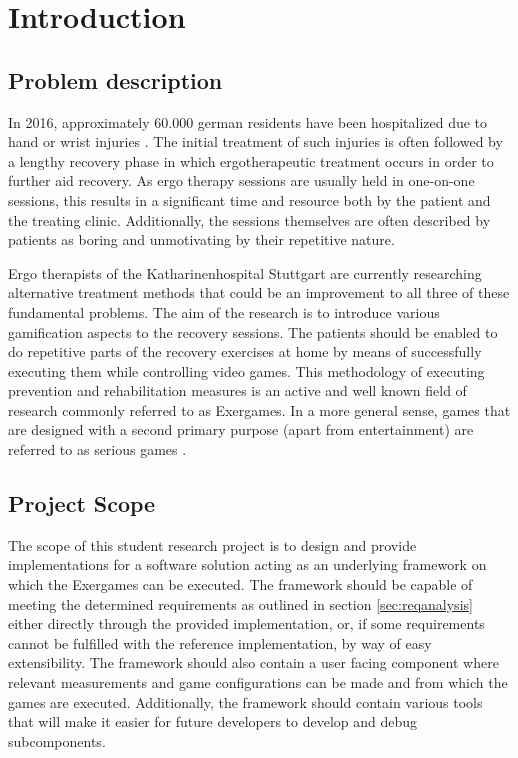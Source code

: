 \chapter{Introduction}
\section{Problem description}
In 2016, approximately 60.000 german residents have been hospitalized due to hand or wrist injuries \cite{DeStatisHandInjuries}. The initial treatment of such injuries is often followed by a lengthy recovery phase in which ergotherapeutic treatment occurs in order to further aid recovery. As ergo therapy sessions are usually held in one-on-one sessions, this results in a significant time and resource both by the patient and the treating clinic. Additionally, the sessions themselves are often described by patients as boring and unmotivating by their repetitive nature.

Ergo therapists of the Katharinenhospital Stuttgart are currently researching alternative treatment methods that could be an improvement to all three of these fundamental problems. The aim of the research is to introduce various gamification aspects to the recovery sessions. The patients should be enabled to do repetitive parts of the recovery exercises at home by means of successfully executing them while controlling video games. This methodology of executing prevention and rehabilitation measures is an active and well known field of research commonly referred to as Exergames\cite{RehaCareExergames}. In a more general sense, games that are designed with a second primary purpose (apart from entertainment) are referred to as serious games \cite{SeriousGamesBook}. 

\section{Project Scope}
The scope of this student research project is to design and provide implementations for a software solution acting as an underlying framework on which the Exergames can be executed. The framework should be capable of meeting the determined requirements as outlined in section \ref{sec:reqanalysis} either directly through the provided implementation, or, if some requirements cannot be fulfilled with the reference implementation, by way of easy extensibility. The framework should also contain a user facing component where relevant measurements and game configurations can be made and from which the games are executed. Additionally, the framework should contain various tools that will make it easier for future developers to develop and debug subcomponents.

